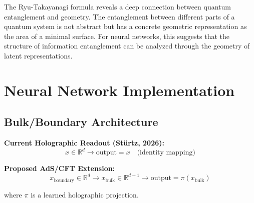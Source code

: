 \documentclass[12pt,a4paper]{article}
\begin{document}
The Ryu-Takayanagi formula reveals a deep connection between quantum entanglement and geometry. The entanglement between different parts of a quantum system is not abstract but has a concrete geometric representation as the area of a minimal surface. For neural networks, this suggests that the structure of information entanglement can be analyzed through the geometry of latent representations.

\section{Neural Network Implementation}

\subsection{Bulk/Boundary Architecture}

\textbf{Current Holographic Readout (Stürtz, 2026):}
\begin{equation}
x \in \mathbb{R}^d \rightarrow \text{output} = x \quad \text{(identity mapping)}
\end{equation}

\textbf{Proposed AdS/CFT Extension:}
\begin{equation}
x_{\text{boundary}} \in \mathbb{R}^d \rightarrow x_{\text{bulk}} \in \mathbb{R}^{d+1} \rightarrow \text{output} = \pi(x_{\text{bulk}})
\end{equation}

where $\pi$ is a learned holographic projection.
\end{document}
